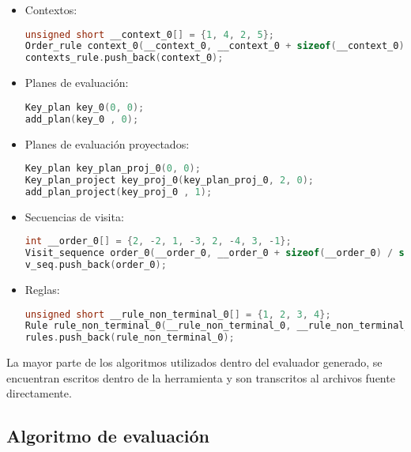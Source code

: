 \begin{itemize}
\item Contextos:
\begin{lstlisting}[language=C++, basicstyle=\scriptsize, columns=fullflexible, linewidth=14cm]
unsigned short __context_0[] = {1, 4, 2, 5};
Order_rule context_0(__context_0, __context_0 + sizeof(__context_0) / sizeof(unsigned short));
contexts_rule.push_back(context_0);
\end{lstlisting}

\item Planes de evaluación:
\begin{lstlisting}[language=C++, basicstyle=\scriptsize, columns=fullflexible, linewidth=9cm]
Key_plan key_0(0, 0);
add_plan(key_0 , 0);
\end{lstlisting}

\item Planes de evaluación proyectados:
\begin{lstlisting}[language=C++, basicstyle=\scriptsize, columns=fullflexible, linewidth=9cm]
Key_plan key_plan_proj_0(0, 0);
Key_plan_project key_proj_0(key_plan_proj_0, 2, 0);
add_plan_project(key_proj_0 , 1);
\end{lstlisting}

\item Secuencias de visita:
\begin{lstlisting}[language=C++, basicstyle=\scriptsize, columns=fullflexible, linewidth=12cm]
int __order_0[] = {2, -2, 1, -3, 2, -4, 3, -1};
Visit_sequence order_0(__order_0, __order_0 + sizeof(__order_0) / sizeof(int));
v_seq.push_back(order_0);
\end{lstlisting}

\item Reglas:
\begin{lstlisting}[language=C++, basicstyle=\scriptsize, columns=fullflexible]
unsigned short __rule_non_terminal_0[] = {1, 2, 3, 4};
Rule rule_non_terminal_0(__rule_non_terminal_0, __rule_non_terminal_0 + sizeof(__rule_non_terminal_0) / sizeof(unsigned short));
rules.push_back(rule_non_terminal_0);
\end{lstlisting}
\end{itemize}

La mayor parte de los algoritmos utilizados dentro del evaluador generado, se encuentran escritos dentro de la herramienta y son transcritos al archivos fuente directamente.

\subsection*{Algoritmo de evaluación}
\label{sec:codcppalgeval}

